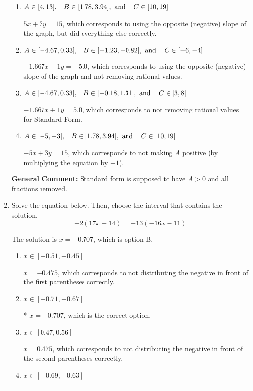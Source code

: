 \documentclass{extbook}[14pt]
\newcommand{\litem}[1]{\item #1

\rule{\textwidth}{0.4pt}}
\begin{document}
\begin{enumerate}
{\begin{enumerate}[label=\Alph*.]
* $5x - 3y = -15$, which is the correct option.
\item \( A \in [4, 13], \hspace{3mm} B \in [1.78, 3.94], \text{ and } \hspace{3mm} C \in [10, 19] \)

 $5x + 3y = 15$, which corresponds to using the opposite (negative) slope of the graph, but did everything else correctly.
\item \( A \in [-4.67, 0.33], \hspace{3mm} B \in [-1.23, -0.82], \text{ and } \hspace{3mm} C \in [-6, -4] \)

 $-1.667x - 1y = -5.0$, which corresponds to using the opposite (negative) slope of the graph and not removing rational values.
\item \( A \in [-4.67, 0.33], \hspace{3mm} B \in [-0.18, 1.31], \text{ and } \hspace{3mm} C \in [3, 8] \)

 $-1.667x + 1y = 5.0$, which corresponds to not removing rational values for Standard Form.
\item \( A \in [-5, -3], \hspace{3mm} B \in [1.78, 3.94], \text{ and } \hspace{3mm} C \in [10, 19] \)

 $-5x + 3y = 15$, which corresponds to not making $A$ positive (by multiplying the equation by $-1$).
\end{enumerate}

\textbf{General Comment:} Standard form is supposed to have $A > 0$ and all fractions removed.
}
\litem{
Solve the equation below. Then, choose the interval that contains the solution.
\[ -2(17x + 14) = -13(-16x -11) \]

The solution is \( x = -0.707 \), which is option B.\begin{enumerate}[label=\Alph*.]
\item \( x \in [-0.51, -0.45] \)

$x = -0.475$, which corresponds to not distributing the negative in front of the first parentheses correctly.
\item \( x \in [-0.71, -0.67] \)

* $x = -0.707$, which is the correct option.
\item \( x \in [0.47, 0.56] \)

$x = 0.475$, which corresponds to not distributing the negative in front of the second parentheses correctly.
\item \( x \in [-0.69, -0.63] \)


\end{enumerate}}
\end{enumerate}
\end{document}
